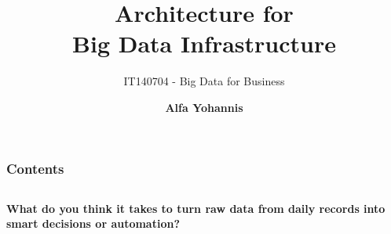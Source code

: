 \documentclass[aspectratio=169, table]{beamer}
\title{\Huge Architecture for\\
	\vspace{10pt}
	Big Data Infrastructure}
\subtitle{IT140704 - Big Data for Business}
\author{\textbf{Alfa Yohannis}}
\begin{document}
	
	\frame{\titlepage}
	
	
	\begin{frame}[fragile]
		\frametitle{Contents}
		\vspace{20pt}
		\begin{columns}[t]
			\tableofcontents[sections={1-6}]
			
			\tableofcontents[sections={7-12}]
		\end{columns}
	\end{frame}


\begin{frame}{\hfill}
	\centering
	\Huge{\textbf{What do you think it takes to turn raw data from daily records into smart decisions or automation?}}
\end{frame}

	
\end{document}
